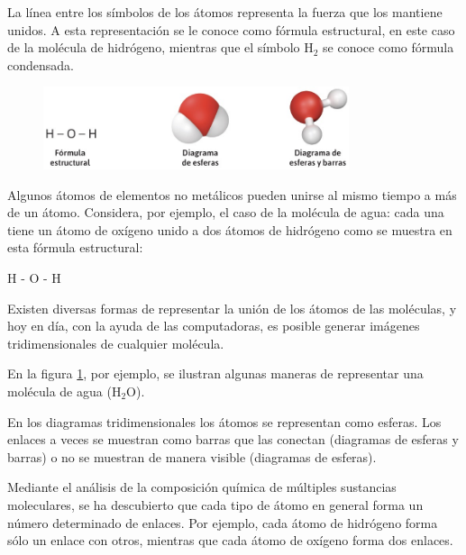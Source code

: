 \documentclass[11pt]{book}
\begin{document}
La línea entre los símbolos de los átomos representa la fuerza que los mantiene unidos.
A esta representación se le conoce como fórmula estructural, en este caso de la molécula
de hidrógeno, mientras que el símbolo H$_2$ se conoce como fórmula condensada.

\begin{figure}[H]
  \centering
  \includegraphics[width=0.8\textwidth]{esferas.jpg}
  \label{fig:esferas}
\end{figure}

Algunos átomos de elementos no metálicos pueden unirse al mismo tiempo a más de un átomo.
Considera, por ejemplo, el caso de la molécula de agua: cada una tiene un átomo de oxígeno
unido a dos átomos de hidrógeno como se muestra en esta fórmula estructural:

\begin{center}
  H - O - H
\end{center}

Existen diversas formas de representar la unión de los átomos de las moléculas, y hoy en día,
con la ayuda de las computadoras, es posible generar imágenes tridimensionales de cualquier
molécula.

En la figura \ref{fig:esferas}, por ejemplo,
se ilustran algunas maneras de representar una molécula de agua (H$_2$O).

En los diagramas tridimensionales los átomos se representan como esferas. Los enlaces a
veces se muestran como barras que las conectan (diagramas de esferas y barras) o no se muestran de manera visible (diagramas de esferas).

Mediante el análisis de la composición química de múltiples sustancias moleculares,
se ha descubierto que cada tipo de átomo en general forma un número determinado de enlaces.
Por ejemplo, cada átomo de hidrógeno forma sólo un enlace con otros, mientras que cada
átomo de oxígeno forma dos enlaces.
\end{document}
